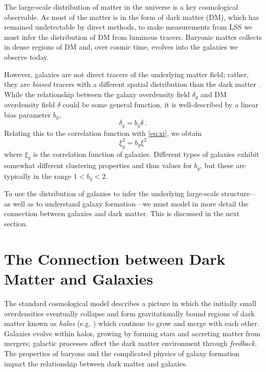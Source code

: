 
The large-scale distribution of matter in the universe is a key cosmological observable.
As most of the matter is in the form of dark matter (DM), which has remained undetectable by direct methods, to make measurements from LSS we must infer the distribution of DM from luminous tracers.
Baryonic matter collects in dense regions of DM and, over cosmic time, evolves into the galaxies we observe today.

However, galaxies are not direct tracers of the underlying matter field; rather, they are \emph{biased} tracers with a different spatial distribution than the dark matter \citep{kaiser_spatial_1984}.
While the relationship between the galaxy overdensity field $\delta_g$ and DM overdensity field $\delta$ could be some general function, it is well-described by a linear bias parameter $b_g$,
\begin{equation}
    \delta_g = b_g \delta ~.
\end{equation}
Relating this to the correlation function with \eqref{eq:xi}, we obtain
\begin{equation}
    \xi_g^2 = b_g \xi^2
\end{equation}
where $\xi_g$ is the correlation function of galaxies.
Different types of galaxies exhibit somewhat different clustering properties and thus values for $b_g$, but these are typically in the range $1<b_g<2$.

To use the distribution of galaxies to infer the underlying large-scale structure---as well as to understand galaxy formation---we must model in more detail the connection between galaxies and dark matter.
This is discussed in the next section.


\section{The Connection between Dark Matter and Galaxies}
\label{sec:galhalo}


The standard cosmological model describes a picture in which the initially small overdensities eventually collapse and form gravitationally bound regions of dark matter known as \emph{halos} (e.g. \citealt{bryan_statistical_1998}) which continue to grow and merge with each other.
Galaxies evolve within halos, growing by forming stars and accreting matter from mergers; galactic processes affect the dark matter environment through \emph{feedback}.
The properties of baryons and the complicated physics of galaxy formation impact the relationship between dark matter and galaxies.

